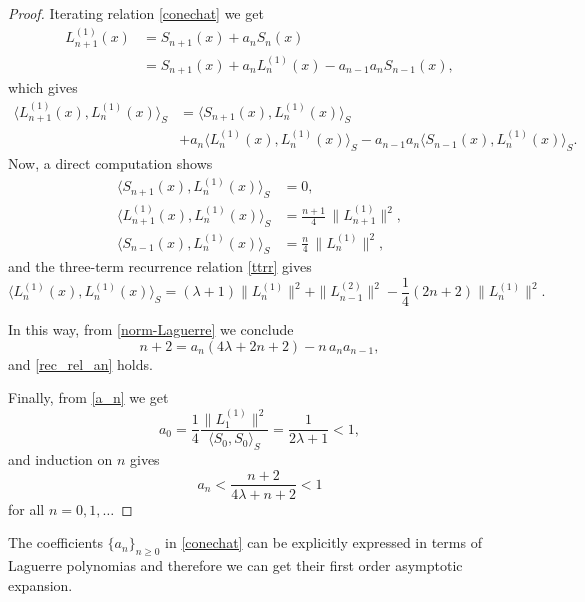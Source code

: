 \documentclass[reqno,10pt]{amsart}
\theoremstyle{plain}
\numberwithin{equation}{section}
\numberwithin{figure}{section}
\begin{document}
\begin{proof}
Iterating relation \eqref{conechat} we get
\begin{align*}
L_{n+1}^{(1)} (x) &= S_{n+1}(x) + {a}_{n}S_{n}(x)\\
&= S_{n+1}(x) + {a}_{n}L_{n}^{(1)}(x) - {a}_{n-1}{a}_{n}S_{n-1}(x),
\end{align*}
which gives
\begin{align*}
\langle L_{n+1}^{(1)} (x), L_{n}^{(1)}(x) \rangle_S &= \langle S_{n+1}(x) , L_{n}^{(1)}(x) \rangle_S\\
&+ a_n \langle L_{n}^{(1)}(x), L_{n}^{(1)}(x) \rangle_S - {a}_{n-1}{a}_{n} \langle S_{n-1}(x), L_{n}^{(1)}(x) \rangle_S.
\end{align*}
Now, a direct computation shows
\begin{align*}
\langle S_{n+1}(x), L_{n}^{(1)}(x) \rangle_S &= 0, \\
\langle L_{n+1}^{(1)} (x), L_{n}^{(1)}(x) \rangle_S &= \frac{n+1}{4} \,  \|L^{(1)}_{n+1}\|^2,\\
\langle S_{n-1}(x), L_{n}^{(1)}(x) \rangle_S &= \frac{n}{4} \,  \|L^{(1)}_n\|^2,
\end{align*}
and the three-term recurrence relation \eqref{ttrr} gives
$$
\langle L_{n}^{(1)} (x), L_{n}^{(1)}(x) \rangle_S = (\lambda+1)   \|L^{(1)}_{n}\|^2
+  \|L^{(2)}_{n-1}\|^2 - \frac{1}{4} (2n+2)  \|L^{(1)}_{n}\|^2.
$$

In this way, from \eqref{norm-Laguerre} we conclude
$$
n+2 = a_n \left( 4 \lambda + 2n +2 \right) - n \, a_n a_{n-1},
$$
and \eqref{rec_rel_an} holds.

Finally, from \eqref{a_n} we get
$$
a_{0} = \frac{1}{4}\frac{\|L^{(1)}_1\|^2}{\langle S_{0}, S_{0} \rangle_S} = \frac{1}{2\lambda + 1 } < 1,
$$
and induction on $n$ gives
$$
a_n < \frac{n+2}{4 \lambda + n  + 2} < 1
$$
for all $n = 0, 1, \ldots$
\end{proof}

\medskip
The coefficients $\{a_n\}_{n\geq 0}$ in \eqref{conechat} can be explicitly expressed in terms of Laguerre polynomias and therefore we can get their first order asymptotic expansion.
\end{document}
